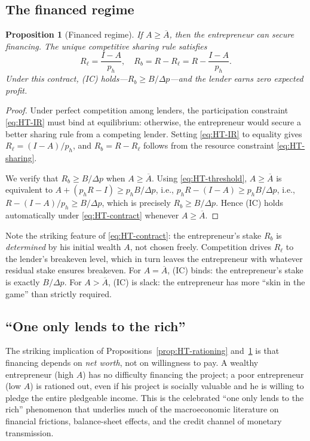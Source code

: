 \documentclass[11pt,a4paper,oneside]{book}
\def\geq{\geqslant}
\theoremstyle{plain}
\newtheorem{proposition}[theorem]{Proposition}
\theoremstyle{definition}
\theoremstyle{remark}
\numberwithin{equation}{chapter}
\begin{document}
\subsection{The financed regime}

\begin{proposition}[Financed regime]\label{prop:HT-financed}
If $A \geq \overline{A}$, then the entrepreneur can secure financing.
The unique competitive sharing rule satisfies
\begin{equation}\label{eq:HT-contract}
  R_\ell = \frac{I - A}{p_h},
  \quad
  R_b = R - R_\ell = R - \frac{I - A}{p_h}.
\end{equation}
Under this contract, (IC) holds---$R_b \geq B/\Delta p$---and the lender earns zero expected profit.
\end{proposition}

\begin{proof}
Under perfect competition among lenders, the participation constraint \eqref{eq:HT-IR} must bind at equilibrium: otherwise, the entrepreneur would secure a better sharing rule from a competing lender.
Setting \eqref{eq:HT-IR} to equality gives $R_\ell = (I - A)/p_h$, and $R_b = R - R_\ell$ follows from the resource constraint \eqref{eq:HT-sharing}.

We verify that $R_b \geq B/\Delta p$ when $A \geq \overline{A}$.
Using \eqref{eq:HT-threshold}, $A \geq \overline{A}$ is equivalent to $A + (p_h R - I) \geq p_h B / \Delta p$, i.e., $p_h R - (I - A) \geq p_h B / \Delta p$, i.e., $R - (I - A)/p_h \geq B/\Delta p$, which is precisely $R_b \geq B/\Delta p$.
Hence (IC) holds automatically under \eqref{eq:HT-contract} whenever $A \geq \overline{A}$.
\end{proof}

Note the striking feature of \eqref{eq:HT-contract}: the entrepreneur's stake $R_b$ is \emph{determined} by his initial wealth $A$, not chosen freely.
Competition drives $R_\ell$ to the lender's breakeven level, which in turn leaves the entrepreneur with whatever residual stake ensures breakeven.
For $A = \overline{A}$, (IC) binds: the entrepreneur's stake is exactly $B/\Delta p$.
For $A > \overline{A}$, (IC) is slack: the entrepreneur has more ``skin in the game'' than strictly required.

\subsection{``One only lends to the rich''}

The striking implication of Propositions~\ref{prop:HT-rationing} and~\ref{prop:HT-financed} is that financing depends on \emph{net worth}, not on willingness to pay.
A wealthy entrepreneur (high $A$) has no difficulty financing the project; a poor entrepreneur (low $A$) is rationed out, even if his project is socially valuable and he is willing to pledge the entire pledgeable income.
This is the celebrated ``one only lends to the rich'' phenomenon that underlies much of the macroeconomic literature on financial frictions, balance-sheet effects, and the credit channel of monetary transmission.
\end{document}

